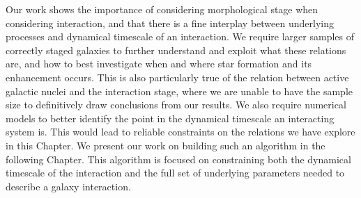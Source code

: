 Our work shows the importance of considering morphological stage when considering interaction, and that there is a fine interplay between underlying processes and dynamical timescale of an interaction. We require larger samples of correctly staged galaxies to further understand and exploit what these relations are, and how to best investigate when and where star formation and its enhancement occurs. This is also particularly true of the relation between active galactic nuclei and the interaction stage, where we are unable to have the sample size to definitively draw conclusions from our results. We also require numerical models to better identify the point in the dynamical timescale an interacting system is. This would lead to reliable constraints on the relations we have explore in this Chapter. We present our work on building such an algorithm in the following Chapter. This algorithm is focused on constraining both the dynamical timescale of the interaction and the full set of underlying parameters needed to describe a galaxy interaction.

